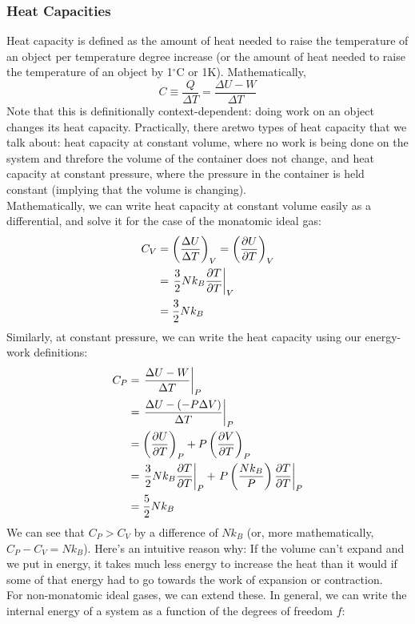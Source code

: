 \documentclass[a4paper]{article}
\begin{document}
\subsubsection{Heat Capacities}
Heat capacity is defined as the amount of heat needed to raise the temperature
of an object per temperature degree increase (or the amount of heat needed to
raise the temperature of an object by 1$^\circ$C or 1K). Mathematically,
\[
	C \equiv \frac{Q}{\Delta T} = \frac{\Delta U - W}{\Delta T}
\]
Note that this is definitionally context-dependent: doing work on an object
changes its heat capacity. Practically, there aretwo types of heat capacity
that we talk about: heat capacity at constant volume, where no work is being
done on the system and threfore the volume of the container does not change,
and heat capacity at constant pressure, where the pressure in the container is
held constant (implying that the volume is changing).\\
Mathematically, we can write heat capacity at constant volume easily as a
differential, and solve it for the case of the monatomic ideal gas:
\begin{align*}
	C_V &= \left(\frac{\Delta U}{\Delta T}\right)_V
	= \left(\frac{\partial U}{\partial T}\right)_V\\
	&= \left.\frac{3}{2}N k_B \frac{\partial T}{\partial T}\right|_V\\
	&= \frac{3}{2}N k_B
\end{align*}
Similarly, at constant pressure, we can write the heat capacity using our
energy-work definitions:
\begin{align*}
	C_P &= \left.\frac{\Delta U - W}{\Delta T}\right|_P\\
	&= \left.\frac{\Delta U - (-P\Delta V)}{\Delta T}\right|_P\\
	&= \left(\frac{\partial U}{\partial T}\right)_P + P\left(\frac{\partial V}{\partial T}\right)_P\\
	&= \left.\frac{3}{2}N k_B \frac{\partial T}{\partial T}\right|_P +
		\left.P\left(\frac{N k_B}{P}\right)\frac{\partial T}{\partial T}\right|_P\\
	&= \frac{5}{2}N k_B
\end{align*}
We can see that $C_P > C_V$ by a difference of $N k_B$ (or, more
mathematically, $C_P - C_V = N k_B$). Here's an intuitive reason why: If the
volume can't expand and we put in energy, it takes much less energy to increase
the heat than it would if some of that energy had to go towards the work of
expansion or contraction.\\
For non-monatomic ideal gases, we can extend these. In general, we can write
the internal energy of a system as a function of the degrees of freedom $f$:
\end{document}
